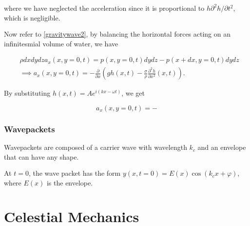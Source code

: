 \documentclass[a4paper,12pt]{report}
\begin{document}
where we have neglected the acceleration since it is proportional to \(h\partial ^2h/\partial t^2\), which is negligible. 

Now refer to \cref{gravitywave2}, by balancing the horizontal forces acting on an infinitesmial volume of water, we have 

\begin{equation}
	\begin{aligned} 
	&\rho dxdydz a_{x}(x,y=0,t) = p(x,y=0,t)dydz - p(x+dx, y=0, t)dydz \\ 
	&\implies a_{x}(x,y=0,t) = -\frac{\partial }{\partial x} \left( gh(x,t) - \frac{\sigma }{\rho } \frac{\partial^2 h}{\partial x^2}(x,t)  \right).  
	\end{aligned} 
\end{equation}

By substituting \(h(x,t) = A e^{i(kx - \omega t)} \), we get 

\begin{equation}
	a_{x}(x,y=0,t) = - 
\end{equation}

\subsection{Wavepackets}

Wavepackets are composed of a carrier wave with wavelength \(k_{c} \) and an envelope that can have any shape. 

At \(t=0\), the wave packet has the form \(y(x,t=0) = E(x)\cos (k_{c}x+\varphi  )\), where \(E(x)\) is the envelope.   

\chapter{Celestial Mechanics}
\end{document}
